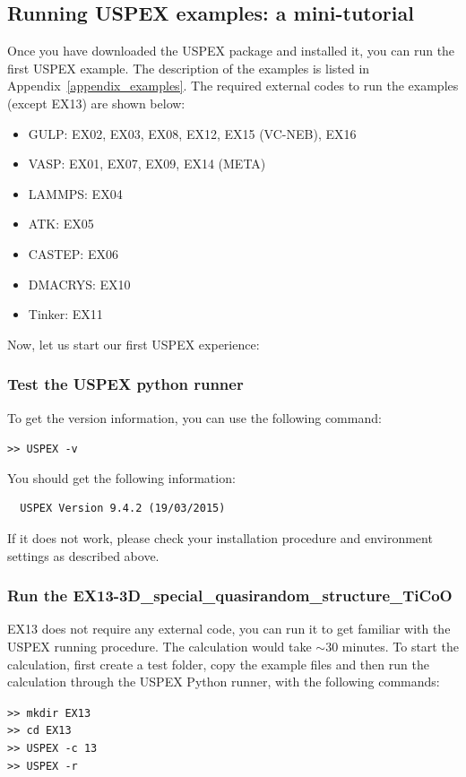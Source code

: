 \documentclass[12pt]{article}
\begin{document}
\subsection{Running USPEX examples: a mini-tutorial}
Once you have downloaded the USPEX package and installed it, you can run the
first USPEX example. The description of the examples is listed in
Appendix~\ref{appendix_examples}. The required external codes to run the
examples (except EX13) are shown below:

{\small\begin{itemize}
\item GULP: EX02, EX03, EX08, EX12, EX15 (VC-NEB), EX16
\item VASP: EX01, EX07, EX09, EX14 (META)
\item LAMMPS: EX04
\item ATK: EX05
\item CASTEP: EX06
\item DMACRYS: EX10
\item Tinker: EX11
\end{itemize}}

Now, let us start our first USPEX experience:

\subsubsection{Test the USPEX python runner}
To get the version information, you can use the following command:

\texttt{>> USPEX -v}

You should get the following information:
{\small\begin{verbatim}
  USPEX Version 9.4.2 (19/03/2015)
\end{verbatim}
}
If it does not work, please check your installation procedure and environment
settings as described above.

\subsubsection{Run the EX13-3D\_special\_quasirandom\_structure\_TiCoO} 
EX13 does not require any external code, you can run it to get familiar with the
USPEX running procedure. The calculation would take $\sim$30 minutes. To start
the calculation, first create a test folder, copy the example files and then run
the calculation through the USPEX Python runner, with the following commands:

\texttt{>> mkdir EX13}\\
\texttt{>> cd EX13}\\
\texttt{>> USPEX -c 13}\\
\texttt{>> USPEX -r}\\
\end{document}
